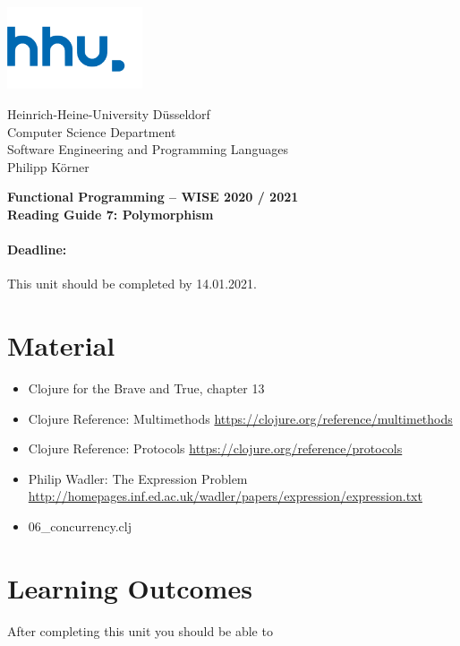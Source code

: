 \documentclass[11pt,a4paper]{article}
\begin{document}
\begin{minipage}[b]{\textwidth}
	\parbox[t]{5cm}{%
		\includegraphics[width=4cm]{unilogo}
		\hfill
	}
	\parbox[b]{11cm}{%
		Heinrich-Heine-University D\"usseldorf\\
		Computer Science Department\\
		Software Engineering and Programming Languages\\
		Philipp K\"orner
	}
\end{minipage}
\begin{center}
	\bf
	Functional Programming -- WISE 2020 / 2021\\
	Reading Guide 7: Polymorphism
\end{center}

\pagestyle{empty}

\paragraph{Deadline:} This unit should be completed by 14.01.2021.

\section{Material} 

\begin{itemize}
\item Clojure for the Brave and True, chapter 13
\item Clojure Reference: Multimethods \url{https://clojure.org/reference/multimethods}
\item Clojure Reference: Protocols \url{https://clojure.org/reference/protocols}
\item Philip Wadler: The Expression Problem \url{http://homepages.inf.ed.ac.uk/wadler/papers/expression/expression.txt}
\item 06\_concurrency.clj
\end{itemize}


\section{Learning Outcomes}

After completing this unit you should be able to
\end{document}
